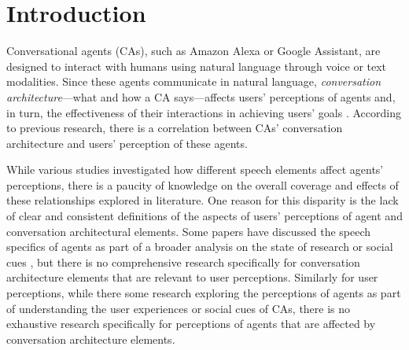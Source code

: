 
\section{Introduction}

Conversational agents (CAs), such as Amazon Alexa or Google Assistant, are designed to interact with humans using natural language through voice or text modalities. Since these agents communicate in natural language, \textit{conversation architecture}---what and how a CA says---affects users' perceptions of agents and, in turn, the effectiveness of their interactions in achieving users' goals \cite{knijnenburg2016inferring, seeger2021chatbots}. According to previous research, there is a correlation between CAs' conversation architecture and users' perception of these agents.

While various studies investigated how different speech elements affect agents' perceptions, there is a paucity of knowledge on the overall coverage and effects of these relationships explored in literature. One reason for this disparity is the lack of clear and consistent definitions of the aspects of users' perceptions of agent and conversation architectural elements. Some papers have discussed the speech specifics of agents as part of  a broader analysis on the state of research \cite{clark2019state} or social cues \cite{feine2019taxonomy}, but there is no comprehensive research specifically for conversation architecture elements that are relevant to user perceptions. Similarly for user perceptions, while there some research exploring the perceptions of agents as part of understanding the user experiences \cite{clark2019state, finch2020towards} or social cues \cite{feine2019taxonomy} of CAs, there is no exhaustive research specifically for perceptions of agents that are affected by conversation architecture elements. 


